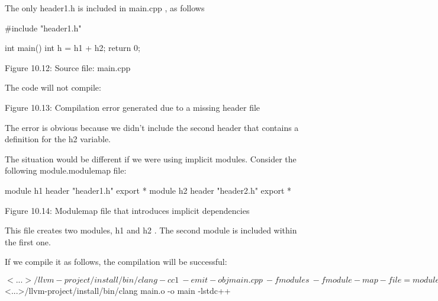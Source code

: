 The only header1.h is included in main.cpp , as follows

\begin{cpp}
#include "header1.h"

int main() {
  int h = h1 + h2;
  return 0;
}
\end{cpp}

\begin{center}
Figure 10.12: Source file: main.cpp
\end{center}

The code will not compile:


\begin{center}
Figure 10.13: Compilation error generated due to a missing header file
\end{center}

The error is obvious because we didn't include the second header that contains a definition for the h2 variable.

The situation would be different if we were using implicit modules. Consider the following module.modulemap file:

\begin{cpp}
module h1 {
  header "header1.h"
  export *
  module h2 {
    header "header2.h"
    export *
  }
}
\end{cpp}

\begin{center}
Figure 10.14: Modulemap file that introduces implicit dependencies
\end{center}

This file creates two modules, h1 and h2 . The second module is included within the first one.

If we compile it as follows, the compilation will be successful:

\begin{shell}
$ <...>/llvm-project/install/bin/clang -cc1 \
        -emit-obj main.cpp                \
        -fmodules                         \
        -fmodule-map-file=module.modulemap\
        -fmodules-cache-path=./cache      \
        -o main.o
$ <...>/llvm-project/install/bin/clang main.o -o main -lstdc++
\end{shell}

